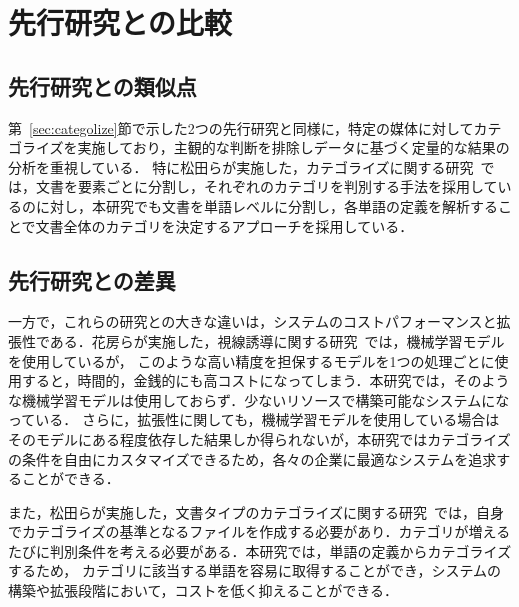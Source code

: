 \section{先行研究との比較}
\label{sec:rela}

\subsection{先行研究との類似点}
\label{subsec:same}

第~\ref{sec:categolize}節で示した2つの先行研究と同様に，特定の媒体に対してカテゴライズを実施しており，主観的な判断を排除しデータに基づく定量的な結果の分析を重視している．
特に松田らが実施した，カテゴライズに関する研究~\cite{matsuda1999}では，文書を要素ごとに分割し，それぞれのカテゴリを判別する手法を採用しているのに対し，本研究でも文書を単語レベルに分割し，各単語の定義を解析することで文書全体のカテゴリを決定するアプローチを採用している．

\subsection{先行研究との差異}
\label{subsec:diff}

一方で，これらの研究との大きな違いは，システムのコストパフォーマンスと拡張性である．花房らが実施した，視線誘導に関する研究~\cite{hanabusa2015}では，機械学習モデルを使用しているが，
このような高い精度を担保するモデルを1つの処理ごとに使用すると，時間的，金銭的にも高コストになってしまう．本研究では，そのような機械学習モデルは使用しておらず．少ないリソースで構築可能なシステムになっている．
さらに，拡張性に関しても，機械学習モデルを使用している場合はそのモデルにある程度依存した結果しか得られないが，本研究ではカテゴライズの条件を自由にカスタマイズできるため，各々の企業に最適なシステムを追求することができる．

また，松田らが実施した，文書タイプのカテゴライズに関する研究~\cite{matsuda1999}では，自身でカテゴライズの基準となるファイルを作成する必要があり．カテゴリが増えるたびに判別条件を考える必要がある．本研究では，単語の定義からカテゴライズするため，
カテゴリに該当する単語を容易に取得することができ，システムの構築や拡張段階において，コストを低く抑えることができる．
